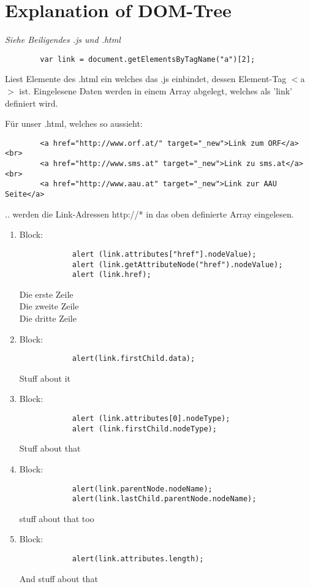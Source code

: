 \documentclass[11pt]{article}
\begin{document}
    \section{Explanation of DOM-Tree}
    \emph{Siehe Beiligendes .js und .html}
    \begin{verbatim}
        var link = document.getElementsByTagName("a")[2];
    \end{verbatim}
    Liest Elemente des .html ein welches das .js einbindet, dessen Element-Tag $<$a$>$ ist.
    Eingelesene Daten werden in einem Array abgelegt, welches als 'link' definiert wird.

    Für unser .html, welches so aussieht:
    \begin{verbatim}
        <a href="http://www.orf.at/" target="_new">Link zum ORF</a><br>
        <a href="http://www.sms.at" target="_new">Link zu sms.at</a><br>
        <a href="http://www.aau.at" target="_new">Link zur AAU Seite</a>
    \end{verbatim}
    .. werden die Link-Adressen http://* in das oben definierte Array eingelesen.

    \begin{enumerate}[1]
        \item Block:
        \begin{verbatim}
            alert (link.attributes["href"].nodeValue);
            alert (link.getAttributeNode("href").nodeValue);
            alert (link.href);
        \end{verbatim}
        Die erste Zeile\\
        Die zweite Zeile\\
        Die dritte Zeile\\

        \item Block:
        \begin{verbatim}
            alert(link.firstChild.data);
        \end{verbatim}
            Stuff about it
        \item Block:
        \begin{verbatim}
            alert (link.attributes[0].nodeType);
            alert (link.firstChild.nodeType);
        \end{verbatim}
        Stuff about that
        \item Block:
        \begin{verbatim}
            alert(link.parentNode.nodeName);
            alert(link.lastChild.parentNode.nodeName);
        \end{verbatim}
        stuff about that too
        \item Block:
        \begin{verbatim}
            alert(link.attributes.length);
        \end{verbatim}
        And stuff about that
    \end{enumerate}
\end{document}
